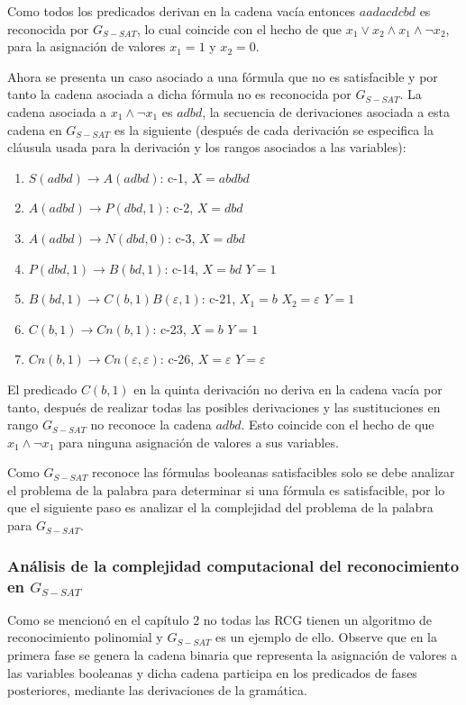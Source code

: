 Como todos los predicados derivan en la cadena vacía entonces $aadacdcbd$ es reconocida por $G_{S-SAT}$, lo
cual coincide con el hecho de que $x_1 \vee  x_2 \wedge x_1 \wedge \neg x_2$, para la asignación de valores
$x_1=1$ y $x_2=0$.

Ahora se presenta un caso asociado a una fórmula que no es satisfacible y por tanto la cadena asociada a dicha
fórmula no es reconocida por $G_{S-SAT}$. La cadena asociada a $x_1  \wedge \neg x_1$ es $adbd$, la secuencia
de derivaciones asociada a esta cadena en $G_{S-SAT}$ es la siguiente  (después de
cada derivación se especifica la cláusula usada para la derivación y los rangos
asociados a las variables):

\begin{enumerate}
    \item $S(adbd)\to A(adbd)$: c-1, $X=abdbd$
    \item $A(adbd)\to P(dbd,1)$: c-2, $X=dbd$
    \item $A(adbd)\to N(dbd,0)$: c-3, $X=dbd$
    \item $P(dbd,1) \to B(bd,1)$: c-14, $X=bd$ $Y=1$
    \item $B(bd,1)\to C(b,1) B(\varepsilon,1)$: c-21, $X_1=b$ $X_2=\varepsilon$ $Y=1$
    \item $C(b,1)\to Cn(b,1)$: c-23, $X=b$ $Y=1$
    \item $Cn(b,1)\to Cn(\varepsilon,\varepsilon)$: c-26, $X=\varepsilon$ $Y=\varepsilon$
\end{enumerate}

El predicado $C(b,1)$ en la quinta derivación no deriva en la cadena vacía por tanto, después de realizar todas las
posibles derivaciones y las sustituciones en rango $G_{S-SAT}$ no reconoce la cadena $adbd$. Esto coincide con el hecho de
que $x_1  \wedge \neg x_1$ para ninguna asignación de valores a sus variables.

Como $G_{S-SAT}$ reconoce las fórmulas booleanas satisfacibles solo se debe analizar el problema de la palabra para determinar si una fórmula es satisfacible,
por lo que el siguiente paso es analizar el la complejidad del problema de la palabra para $G_{S-SAT}$.

\subsubsection{Análisis de la complejidad computacional del reconocimiento en $G_{S-SAT}$}

Como se mencionó en el capítulo 2 no todas las RCG tienen un algoritmo de reconocimiento polinomial y $G_{S-SAT}$
es un ejemplo de ello. Observe que en la primera fase se genera la cadena binaria que representa la asignación
de valores a las variables booleanas y dicha cadena participa en los predicados de fases posteriores, mediante
las derivaciones de la gramática.

